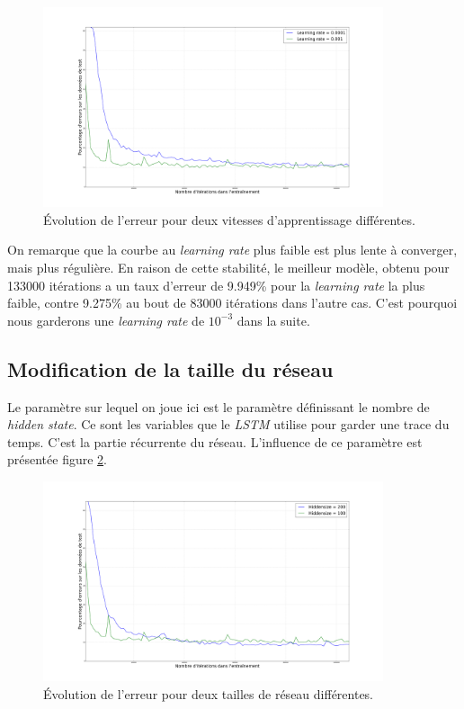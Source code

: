 \documentclass{article}
\begin{document}
\begin{figure}[!h] 
	\center
	\includegraphics[width=10cm]{error_plot_lrat.png}
	\caption{Évolution de l'erreur pour deux vitesses d'apprentissage différentes.}
	\label{err_lrate}
\end{figure}

On remarque que la courbe au \textit{learning rate} plus faible est plus lente à converger, mais plus régulière. En raison de cette stabilité, le meilleur modèle, obtenu pour 133000 itérations a un taux d'erreur de 9.949\% pour la \textit{learning rate} la plus faible, contre 9.275\% au bout de 83000 itérations dans l'autre cas. C'est pourquoi nous garderons une \textit{learning rate} de $10^{-3}$ dans la suite.

\subsection{Modification de la taille du réseau}

Le paramètre sur lequel on joue ici est le paramètre définissant le nombre de \textit{hidden state}. Ce sont les variables que le \textit{LSTM} utilise pour garder une trace du temps. C'est la partie récurrente du réseau. L'influence de ce paramètre est présentée figure \ref{err_size}.

\begin{figure}[!h] 
	\center
	\includegraphics[width=10cm]{error_plot_size.png}
	\caption{Évolution de l'erreur pour deux tailles de réseau différentes.}
	\label{err_size}
\end{figure}
\end{document}
